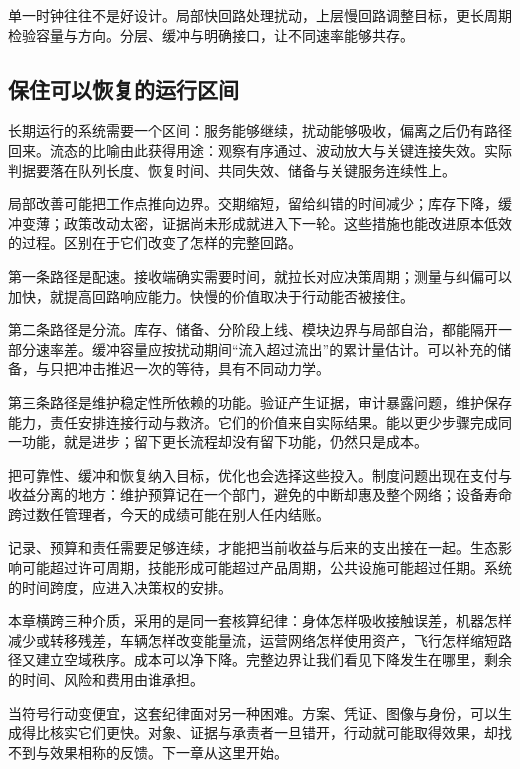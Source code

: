 单一时钟往往不是好设计。局部快回路处理扰动，上层慢回路调整目标，更长周期检验容量与方向。分层、缓冲与明确接口，让不同速率能够共存。

\subsection{保住可以恢复的运行区间}

长期运行的系统需要一个区间：服务能够继续，扰动能够吸收，偏离之后仍有路径回来。流态的比喻由此获得用途：观察有序通过、波动放大与关键连接失效。实际判据要落在队列长度、恢复时间、共同失效、储备与关键服务连续性上。

局部改善可能把工作点推向边界。交期缩短，留给纠错的时间减少；库存下降，缓冲变薄；政策改动太密，证据尚未形成就进入下一轮。这些措施也能改进原本低效的过程。区别在于它们改变了怎样的完整回路。

第一条路径是配速。接收端确实需要时间，就拉长对应决策周期；测量与纠偏可以加快，就提高回路响应能力。快慢的价值取决于行动能否被接住。

第二条路径是分流。库存、储备、分阶段上线、模块边界与局部自治，都能隔开一部分速率差。缓冲容量应按扰动期间“流入超过流出”的累计量估计。可以补充的储备，与只把冲击推迟一次的等待，具有不同动力学。

第三条路径是维护稳定性所依赖的功能。验证产生证据，审计暴露问题，维护保存能力，责任安排连接行动与救济。它们的价值来自实际结果。能以更少步骤完成同一功能，就是进步；留下更长流程却没有留下功能，仍然只是成本。

把可靠性、缓冲和恢复纳入目标，优化也会选择这些投入。制度问题出现在支付与收益分离的地方：维护预算记在一个部门，避免的中断却惠及整个网络；设备寿命跨过数任管理者，今天的成绩可能在别人任内结账。

记录、预算和责任需要足够连续，才能把当前收益与后来的支出接在一起。生态影响可能超过许可周期，技能形成可能超过产品周期，公共设施可能超过任期。系统的时间跨度，应进入决策权的安排。

本章横跨三种介质，采用的是同一套核算纪律：身体怎样吸收接触误差，机器怎样减少或转移残差，车辆怎样改变能量流，运营网络怎样使用资产，飞行怎样缩短路径又建立空域秩序。成本可以净下降。完整边界让我们看见下降发生在哪里，剩余的时间、风险和费用由谁承担。

当符号行动变便宜，这套纪律面对另一种困难。方案、凭证、图像与身份，可以生成得比核实它们更快。对象、证据与承责者一旦错开，行动就可能取得效果，却找不到与效果相称的反馈。下一章从这里开始。

